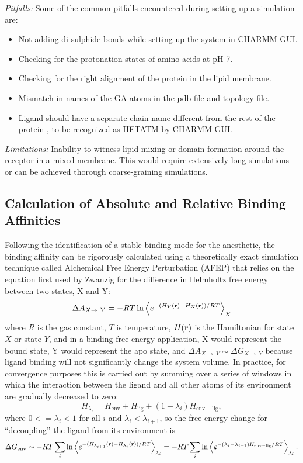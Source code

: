 \documentclass[12pt]{article}
\begin{document}
\textit{Pitfalls:} 
Some of the common pitfalls encountered during setting up a simulation are:
		\begin{itemize}
			\item Not adding di-sulphide bonds while setting up the system in CHARMM-GUI.
			\item Checking for the protonation states of amino acids at pH 7.
			\item Checking for the right alignment of the protein in the lipid membrane.
			\item Mismatch in names of the GA atoms in the pdb file and topology file.
			\item Ligand should have a separate chain name different from the rest of the protein , to be recognized as HETATM by CHARMM-GUI.
		\end{itemize}		
	 
\textit{Limitations:} Inability to witness lipid mixing or domain formation around the receptor in a mixed membrane. This would require extensively long simulations or can be achieved thorough coarse-graining simulations.

  
\subsection{Calculation of Absolute and Relative Binding Affinities}
Following the identification of a stable binding mode for the anesthetic, the binding affinity can be rigorously calculated using a theoretically exact simulation technique called Alchemical Free Energy Perturbation (AFEP) that relies on the  equation first used by Zwanzig\cite{Zwanzig1954} for the difference in Helmholtz free energy between two states, X and Y:
\begin{equation}
\Delta A_{X\rightarrow~Y} = -R T \ln \left \langle  e^{-({H_{Y}({\bf r})-H_{X}({\bf r})})/R T} \right \rangle_{X}
\end{equation}
where $R$ is the gas constant, $T$ is temperature, $H({\bf r})$ is the Hamiltonian for state $X$ or state $Y$, and in a binding free energy application, X would represent the bound state, Y would represent the apo state, and $\Delta A_{X\rightarrow~Y} \sim \Delta G_{X\rightarrow~Y}$ because ligand binding will not significantly change the system volume. In practice,\cite{Beveridge1989,Mark2002} for convergence purposes this is carried out by summing over a series of windows in which the interaction between the ligand and all other atoms of its environment are gradually decreased to zero: 
\begin{equation}
H_{\lambda_{i}} = H_{\mathrm{env}} + H_{\mathrm{lig}} + (1 - \lambda_{i}) H_{\mathrm{env-lig}} , 
\end{equation} 
where $0<=\lambda_{i}<1$ for all $i$ and $\lambda_{i}<\lambda_{i+1}$, so the free energy change for ``decoupling'' the ligand from its environment is 
\begin{equation}
\Delta G_{\mathrm{env}} \sim -R T \sum_{i}   \ln \left \langle  e^{-({H_{\lambda_{i+1}}({\bf r})-H_{\lambda_{i}}({\bf r})})/R T} \right \rangle_{\lambda_{i}} = -R T \sum_{i}   \ln \left \langle  e^{-( \lambda_{i} - \lambda_{i+1}) H_{\mathrm{env-lig}}/R T} \right \rangle_{\lambda_{i}} \label{eq:lambda}. 
\end{equation}
\end{document}
